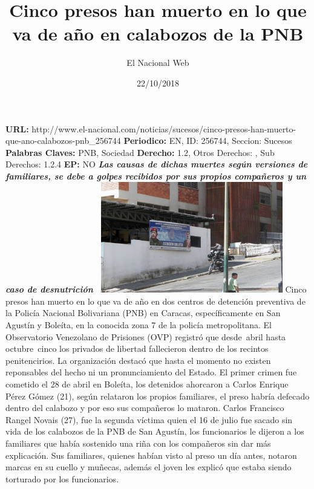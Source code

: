 \documentclass{article}%
\title{\textbf{Cinco presos han muerto en lo que va de año en calabozos de la PNB}}%
\author{El Nacional Web}%
\date{22/10/2018}%
\begin{document}
%
\normalsize%
\maketitle%
\textbf{URL: }%
http://www.el{-}nacional.com/noticias/sucesos/cinco{-}presos{-}han{-}muerto{-}que{-}ano{-}calabozos{-}pnb\_256744\newline%
%
\textbf{Periodico: }%
EN, %
ID: %
256744, %
Seccion: %
Sucesos\newline%
%
\textbf{Palabras Claves: }%
PNB, Sociedad\newline%
%
\textbf{Derecho: }%
1.2, %
Otros Derechos: %
, %
Sub Derechos: %
1.2.4\newline%
%
\textbf{EP: }%
NO\newline%
\newline%
%
\textbf{\textit{Las causas de dichas muertes según versiones de familiares, se debe a golpes recibidos por sus propios compañeros y un caso de desnutrición~}}%
\newline%
\newline%
%
\includegraphics[width=300px]{125.jpg}%
\newline%
%
Cinco presos han muerto en lo que va de año en dos centros de detención preventiva de la Policía Nacional Bolivariana (PNB) en Caracas, específicamente en San Agustín y Boleíta, en la conocida zona 7 de la policía metropolitana.%
\newline%
%
El Observatorio Venezolano de Prisiones (OVP) registró que desde~abril hasta octubre~cinco los privados de libertad fallecieron dentro de los recintos penitencirios. La organización destacó que hasta el momento no existen reponsables del hecho ni un pronunciamiento del Estado.%
\newline%
%
El primer crimen fue cometido el 28 de abril en Boleíta, los detenidos ahorcaron a Carlos Enrique Pérez Gómez (21), según relataron los propios familiares, el preso habría defecado dentro del calabozo y por eso sus compañeros lo mataron.%
\newline%
%
Carlos Francisco Rangel Novais (27), fue la segunda víctima quien el 16 de julio fue sacado sin vida de los calabozos de la PNB de San Agustín, los funcionarios le dijeron a los familiares que había sostenido una riña con los compañeros sin dar más explicación. Sus familiares, quienes habían visto al preso un día antes, notaron marcas en su cuello y muñecas, además el joven les explicó que estaba siendo torturado por los funcionarios.%
\end{document}

